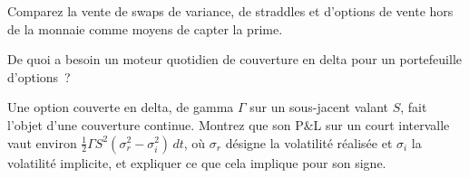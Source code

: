 \begin{interviewq}\label{iq:s2:harvesting-the-variance-risk-premium:4}
Comparez la vente de swaps de variance, de straddles et d'options de vente hors de la monnaie comme moyens de capter la prime.
\end{interviewq}

\begin{interviewq}\label{iq:s2:harvesting-the-variance-risk-premium:5}
De quoi a besoin un moteur quotidien de couverture en delta pour un portefeuille d'options~?
\end{interviewq}

\begin{interviewq}\label{iq:s2:harvesting-the-variance-risk-premium:6}
Une option couverte en delta, de gamma $\Gamma$ sur un sous-jacent valant $S$, fait l'objet d'une couverture continue. Montrez que son P\&L sur un court intervalle vaut environ
$\tfrac12\Gamma S^2(\sigma_r^2 - \sigma_i^2)\,dt$, où $\sigma_r$ désigne la volatilité réalisée et $\sigma_i$ la volatilité implicite, et expliquer ce que cela implique pour son signe.
\end{interviewq}

